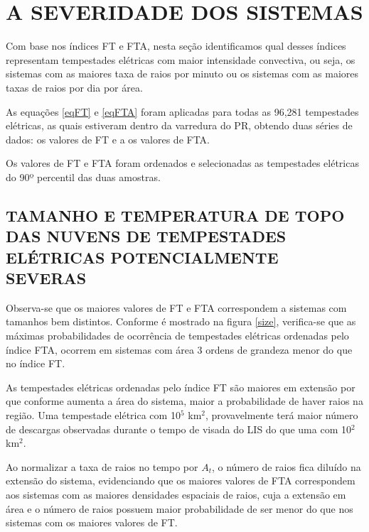 \chapter{A SEVERIDADE DOS SISTEMAS}

Com base nos índices FT e FTA, nesta seção identificamos qual desses índices representam  tempestades elétricas com maior intensidade convectiva, ou seja, os sistemas com as maiores taxa de raios por minuto ou os sistemas com as maiores taxas de raios por dia por área. 

As equações \ref{eqFT} e \ref{eqFTA} foram aplicadas para todas as 96,281 tempestades elétricas, as quais estiveram dentro da varredura do PR, obtendo duas séries de dados: os valores de FT e a os valores de FTA. 

Os valores de FT e FTA foram ordenados e selecionadas as tempestades elétricas do 90º percentil das duas amostras.

\section{TAMANHO E TEMPERATURA DE TOPO DAS NUVENS DE TEMPESTADES ELÉTRICAS POTENCIALMENTE SEVERAS}

Observa-se que os maiores valores de FT e FTA correspondem a sistemas com tamanhos bem distintos. Conforme é mostrado na figura \ref{size}, verifica-se que as máximas probabilidades de ocorrência de tempestades elétricas ordenadas pelo índice FTA, ocorrem em sistemas com área 3 ordens de grandeza menor do que no índice FT.

As tempestades elétricas ordenadas pelo índice FT são maiores em extensão por que conforme aumenta a área do sistema, maior a probabilidade de haver raios na região. Uma tempestade elétrica com 10$^5$ km$^2$, provavelmente terá maior número de descargas observadas durante o tempo de visada do LIS do que uma com 10$^2$ km$^2$. 


Ao normalizar a taxa de raios no tempo por $A_t$, o número de raios fica diluído na extensão do sistema, evidenciando que os maiores valores de FTA correspondem aos sistemas com as maiores densidades espaciais de raios, cuja a extensão em área e o número de raios possuem maior probabilidade de ser menor do que nos sistemas com os maiores valores de FT.

